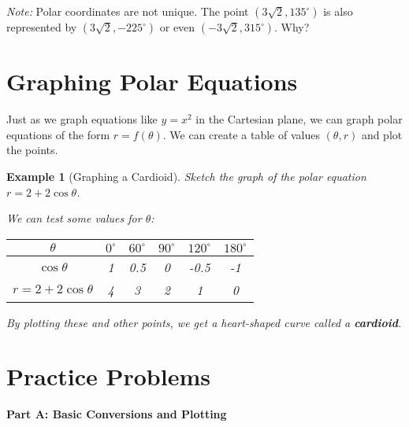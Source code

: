 \documentclass[12pt]{article}
\newtheorem{example}{Example}
\begin{document}
\textit{Note:} Polar coordinates are not unique. The point $(3\sqrt{2}, 135^\circ)$ is also represented by $(3\sqrt{2}, -225^\circ)$ or even $(-3\sqrt{2}, 315^\circ)$. Why?

\section{Graphing Polar Equations}

Just as we graph equations like $y = x^2$ in the Cartesian plane, we can graph polar equations of the form $r = f(\theta)$. We can create a table of values $(\theta, r)$ and plot the points.

\begin{example}[Graphing a Cardioid]
Sketch the graph of the polar equation $r = 2 + 2\cos\theta$.

We can test some values for $\theta$:
\begin{center}
\begin{tabular}{|c|c|c|c|c|c|}
\hline
$\theta$ & $0^\circ$ & $60^\circ$ & $90^\circ$ & $120^\circ$ & $180^\circ$ \\
\hline
$\cos\theta$ & 1 & 0.5 & 0 & -0.5 & -1 \\
\hline
$r = 2+2\cos\theta$ & 4 & 3 & 2 & 1 & 0 \\
\hline
\end{tabular}
\end{center}
By plotting these and other points, we get a heart-shaped curve called a \textbf{cardioid}.
\end{example}

\newpage

\section{Practice Problems}

\textbf{Part A: Basic Conversions and Plotting}
\end{document}
